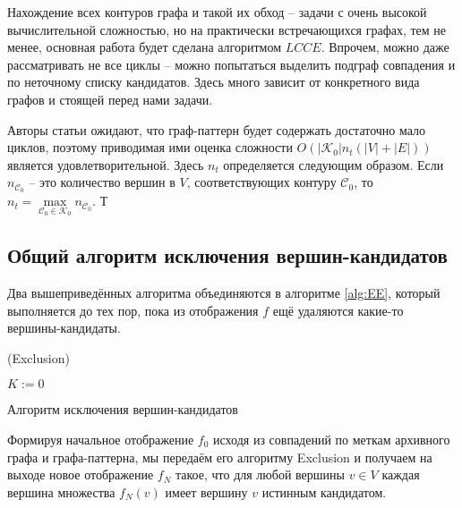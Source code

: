 Нахождение всех контуров графа и такой их обход -- задачи с очень высокой вычислительной сложностью, но на практически встречающихся графах, тем не менее, основная работа будет сделана алгоритмом $LCCE$. Впрочем, можно даже рассматривать не все циклы -- можно попытаться выделить подграф совпадения и по неточному списку кандидатов. Здесь много зависит от конкретного вида графов и стоящей перед нами задачи.

Авторы статьи \cite{patmat} ожидают, что граф-паттерн будет содержать достаточно мало циклов, поэтому приводимая ими оценка сложности $O(|\mathcal{K}_0|\allowbreak n_t \allowbreak (|V| + |E|))$ является удовлетворительной. Здесь $n_t$ определяется следующим образом. Если $n_{\mathcal{C}_0}$ -- это количество вершин в $V$, соответствующих контуру $\mathcal{C}_0$, то $n_t = \max\limits_{\mathcal{C}_0 \in \mathcal{K}_0} n_{\mathcal{C}_0}$. Т

\subsection{Общий алгоритм исключения вершин-кандидатов}

Два вышеприведённых алгоритма объединяются в алгоритме \ref{alg:EE}, который выполняется до тех пор, пока из отображения $f$ ещё удаляются какие-то вершины-кандидаты.

\begin{algorithm}
	\Large
	\Begin(Exclusion){
		$K := 0$
		
	}

	\caption{Алгоритм исключения вершин-кандидатов}
	\label{alg:EE}
\end{algorithm}

Формируя начальное отображение $f_0$ исходя из совпадений по меткам архивного графа и графа-паттерна, мы передаём его алгоритму Exclusion и получаем на выходе новое отображение $f_N$ такое, что для любой вершины $v \in V$ каждая вершина множества $f_N(v)$ имеет вершину $v$ истинным кандидатом.

